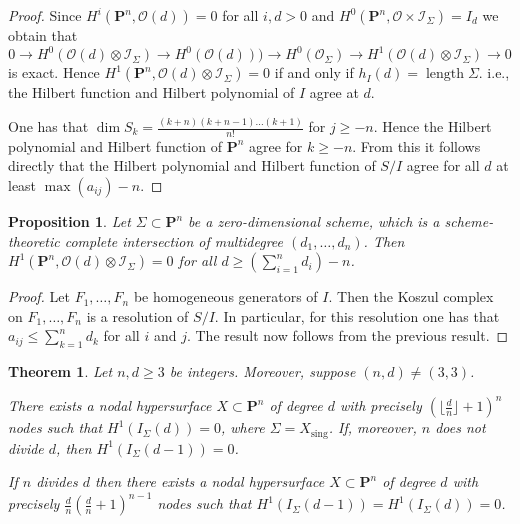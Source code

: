 \documentclass[10pt,a4paper]{amsart}
\newcommand{\Ps}{\mathbf{P}}
\newcommand{\cO}{\mathcal{O}}
\newcommand{\cI}{\mathcal{I}}
\newtheorem{proposition}[lemma]{Proposition}
\newtheorem{theorem}[lemma]{Theorem}
\DeclareMathOperator{\length}{length}
\DeclareMathOperator{\sing}{sing}
\begin{document}
\begin{proof} Since $H^i(\Ps^n,\cO(d))=0$ for all $i,d>0$ and $H^0(\Ps^n,\cO\times \cI_{\Sigma})=I_d$ we obtain that
\[ 0 \to H^0(\cO(d)\otimes \cI_{\Sigma}) \to H^0(\cO(d))) \to H^0(\cO_{\Sigma}) \to H^1(\cO(d)\otimes \cI_{\Sigma}) \to 0 \] is exact.  
Hence  $H^1(\Ps^n,\cO(d)\otimes \cI_{\Sigma})=0$ if and only if $h_I(d)=\length \Sigma$. i.e., the Hilbert function and Hilbert polynomial of $I$ agree at $d$.

One has that $\dim S_k=\frac{(k+n)(k+n-1)\dots (k+1)}{n!}$ for $j\geq -n$. Hence the Hilbert polynomial and Hilbert function of $\Ps^n$ agree for $k\geq -n$. From this it follows directly that the Hilbert polynomial and Hilbert function of $S/I$ agree for all $d$ at least $\max(a_{ij})-n$.
\end{proof}

\begin{proposition}\label{prpHilbBound} Let $\Sigma\subset \Ps^n$ be a zero-dimensional scheme, which is a scheme-theoretic complete  intersection of multidegree $(d_1,\dots,d_n)$. 
Then $H^1(\Ps^n,\cO(d)\otimes \cI_{\Sigma})=0$ for all $d\geq (\sum_{i=1}^n d_i)-n$.
\end{proposition}
\begin{proof}
Let $F_1,\dots,F_n$ be  homogeneous generators of $I$. Then the Koszul complex on $F_1,\dots,F_n$ is a resolution of $S/I$. In particular, for this resolution one has that $a_{ij}\leq \sum_{k=1}^n d_k$ for all $i$ and $j$. The result now follows from the previous result.
\end{proof}



\begin{theorem}\label{thmLowerSur} Let $n,d\geq 3$ be integers.  Moreover, suppose $(n,d)\neq (3,3)$. 

There exists a nodal hypersurface $X\subset\Ps^{n}$ of degree $d$ with precisely $(\lfloor \frac{d}{n} \rfloor+1)^{n}$ nodes such that $H^1(I_{\Sigma} (d))=0$, where $\Sigma=X_{\sing}$. If, moreover, $n$ does not divide $d$, then  $H^1(I_{\Sigma} (d-1))=0$.

If $n$  divides $d$ then there exists a nodal hypersurface $X\subset\Ps^{n}$ of degree $d$ with precisely $\frac{d}{n} (\frac{d}{n}+1)^{n-1}$ nodes such that $H^1(I_{\Sigma} (d-1))=H^1(I_{\Sigma} (d))=0$. 
\end{theorem}
\end{document}
